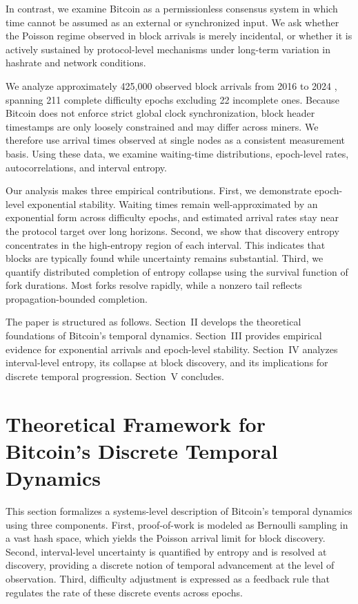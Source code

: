 \documentclass[conference]{IEEEtran}
\begin{document}
In contrast, we examine Bitcoin as a permissionless consensus system in which
time cannot be assumed as an external or synchronized input. We ask whether the
Poisson regime observed in block arrivals is merely incidental, or whether it is
actively sustained by protocol-level mechanisms under long-term variation in
hashrate and network conditions.

We analyze approximately 425{,}000 observed block arrivals from 2016 to 2024
\cite{blockarrivaltime}, spanning 211 complete difficulty epochs excluding 22
incomplete ones. Because Bitcoin does not enforce strict global clock
synchronization, block header timestamps are only loosely constrained and may
differ across miners. We therefore use arrival times observed at single nodes as
a consistent measurement basis. Using these data, we examine waiting-time
distributions, epoch-level rates, autocorrelations, and interval entropy.

Our analysis makes three empirical contributions. First, we demonstrate epoch-level exponential stability. Waiting times remain well-approximated by an exponential form across difficulty epochs, and estimated arrival rates stay near the protocol target over long horizons. Second, we show that discovery entropy concentrates in the high-entropy region of each interval. This indicates that blocks are typically found while uncertainty remains substantial. Third, we quantify distributed completion of entropy collapse using the survival function of fork durations. Most forks resolve rapidly, while a nonzero tail reflects propagation-bounded completion.




The paper is structured as follows. Section~II develops the theoretical foundations of Bitcoin’s temporal dynamics. Section~III provides empirical evidence for exponential arrivals and epoch-level stability. Section~IV analyzes interval-level entropy, its collapse at block discovery, and its implications for discrete temporal progression. Section~V concludes.

\section{Theoretical Framework for Bitcoin’s Discrete Temporal Dynamics}
\label{sec:theory}

This section formalizes a systems-level description of Bitcoin’s temporal dynamics using three components. First, proof-of-work is modeled as Bernoulli sampling in a vast hash space, which yields the Poisson arrival limit for block discovery. Second, interval-level uncertainty is quantified by entropy and is resolved at discovery, providing a discrete notion of temporal advancement at the level of observation. Third, difficulty adjustment is expressed as a feedback rule that regulates the rate of these discrete events across epochs.
\end{document}

